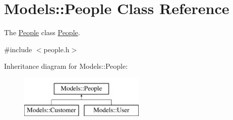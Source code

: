 \hypertarget{classModels_1_1People}{}\section{Models\+:\+:People Class Reference}
\label{classModels_1_1People}


The \hyperlink{classModels_1_1People}{People} class \hyperlink{classModels_1_1People}{People}.  




{\ttfamily \#include $<$people.\+h$>$}

Inheritance diagram for Models\+:\+:People\+:\begin{figure}[H]
\begin{center}
\leavevmode
\includegraphics[height=2.000000cm]{de/d0a/classModels_1_1People}
\end{center}
\end{figure}
